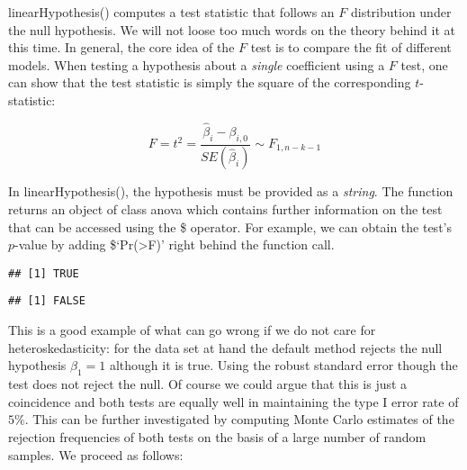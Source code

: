 \documentclass[]{book}
\newenvironment{Shaded}{\begin{snugshade}}{\end{snugshade}}
\newcommand{\KeywordTok}[1]{\textcolor[rgb]{0.13,0.29,0.53}{\textbf{#1}}}
\newcommand{\DataTypeTok}[1]{\textcolor[rgb]{0.13,0.29,0.53}{#1}}
\newcommand{\DecValTok}[1]{\textcolor[rgb]{0.00,0.00,0.81}{#1}}
\newcommand{\FloatTok}[1]{\textcolor[rgb]{0.00,0.00,0.81}{#1}}
\newcommand{\StringTok}[1]{\textcolor[rgb]{0.31,0.60,0.02}{#1}}
\newcommand{\CommentTok}[1]{\textcolor[rgb]{0.56,0.35,0.01}{\textit{#1}}}
\newcommand{\OperatorTok}[1]{\textcolor[rgb]{0.81,0.36,0.00}{\textbf{#1}}}
\newcommand{\NormalTok}[1]{#1}
\theoremstyle{definition}
\theoremstyle{definition}
\theoremstyle{definition}
\theoremstyle{remark}
\let\BeginKnitrBlock\begin \let\EndKnitrBlock\end
\begin{document}
\BeginKnitrBlock{rmdknit}
linearHypothesis() computes a test statistic that follows an \(F\)
distribution under the null hypothesis. We will not loose too much words
on the theory behind it at this time. In general, the core idea of the
\(F\) test is to compare the fit of different models. When testing a
hypothesis about a \emph{single} coefficient using a \(F\) test, one can
show that the test statistic is simply the square of the corresponding
\(t\)-statistic:

\[ F = t^2 = \frac{\hat\beta_i - \beta_{i,0}}{SE(\hat\beta_i)} \sim F_{1,n-k-1}  \]

In linearHypothesis(), the hypothesis must be provided as a
\emph{string}. The function returns an object of class anova which
contains further information on the test that can be accessed using the
\$ operator. For example, we can obtain the test's \(p\)-value by adding
\$`Pr(\textgreater{}F)' right behind the function call.
\EndKnitrBlock{rmdknit}

\begin{Shaded}
\end{Shaded}

\begin{verbatim}
## [1] TRUE
\end{verbatim}

\begin{Shaded}
\end{Shaded}

\begin{verbatim}
## [1] FALSE
\end{verbatim}

This is a good example of what can go wrong if we do not care for
heteroskedasticity: for the data set at hand the default method rejects
the null hypothesis \(\beta_1 = 1\) although it is true. Using the
robust standard error though the test does not reject the null. Of
course we could argue that this is just a coincidence and both tests are
equally well in maintaining the type I error rate of \(5\%\). This can
be further investigated by computing Monte Carlo estimates of the
rejection frequencies of both tests on the basis of a large number of
random samples. We proceed as follows:
\end{document}
